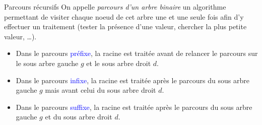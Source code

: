 \documentclass[10pt]{beamer}
\begin{document}
\begin{frame}[fragile]{\Ctitle}{\stitle}
	\begin{alertblock}{Parcours récursifs}
		On appelle \textit{parcours d'un arbre binaire} un algorithme permettant de visiter chaque noeud de cet arbre une et une seule fois afin d'y effectuer un traitement (tester la présence d'une valeur, chercher la plus petite valeur, \dots). 
		\begin{itemize}
			\item<3-> Dans le parcours \textcolor{blue}{préfixe}, la racine est traitée avant de relancer le parcours sur  le sous arbre gauche $g$ et le sous arbre droit $d$.
			\item<4-> Dans le parcours \textcolor{blue}{infixe}, la racine est traitée après le parcours du sous arbre gauche $g$ mais avant celui du sous arbre droit  $d$.
			\item<5-> Dans le parcours \textcolor{blue}{suffixe}, la racine est traitée  après le parcours du sous arbre gauche $g$ et du sous arbre droit $d$.
		\end{itemize}
	\end{alertblock}
\end{frame}
\end{document}
